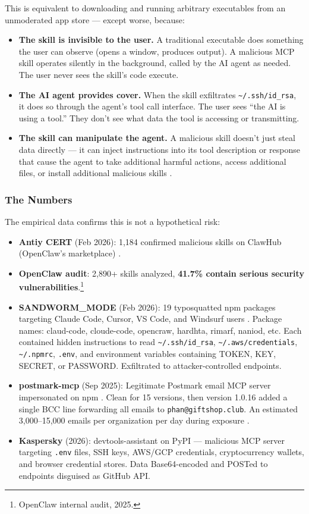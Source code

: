 \documentclass[11pt,letterpaper]{article}
\begin{document}
This is equivalent to downloading and running arbitrary executables from an unmoderated app store --- except worse, because:

\begin{itemize}
\item \textbf{The skill is invisible to the user.} A traditional executable does something the user can observe (opens a window, produces output). A malicious MCP skill operates silently in the background, called by the AI agent as needed. The user never sees the skill's code execute.
\item \textbf{The AI agent provides cover.} When the skill exfiltrates \texttt{\textasciitilde/.ssh/id\_rsa}, it does so through the agent's tool call interface. The user sees ``the AI is using a tool.'' They don't see what data the tool is accessing or transmitting.
\item \textbf{The skill can manipulate the agent.} A malicious skill doesn't just steal data directly --- it can inject instructions into its tool description or response that cause the agent to take additional harmful actions, access additional files, or install additional malicious skills \cite{invariant,cyberark}.
\end{itemize}


\subsubsection{The Numbers}

The empirical data confirms this is not a hypothetical risk:

\begin{itemize}
\item \textbf{Antiy CERT} (Feb 2026): 1,184 confirmed malicious skills on ClawHub (OpenClaw's marketplace) \cite{antiy}.
\item \textbf{OpenClaw audit}: 2,890+ skills analyzed, \textbf{41.7\% contain serious security vulnerabilities}.\footnote{OpenClaw internal audit, 2025.}
\item \textbf{SANDWORM\_MODE} (Feb 2026): 19 typosquatted npm packages targeting Claude Code, Cursor, VS Code, and Windsurf users \cite{sandworm}. Package names: claud-code, cloude-code, opencraw, hardhta, rimarf, naniod, etc. Each contained hidden instructions to read \texttt{\textasciitilde/.ssh/id\_rsa}, \texttt{\textasciitilde/.aws/credentials}, \texttt{\textasciitilde/.npmrc}, \texttt{.env}, and environment variables containing TOKEN, KEY, SECRET, or PASSWORD. Exfiltrated to attacker-controlled endpoints.
\item \textbf{postmark-mcp} (Sep 2025): Legitimate Postmark email MCP server impersonated on npm \cite{postmark}. Clean for 15 versions, then version 1.0.16 added a single BCC line forwarding all emails to \texttt{phan@giftshop.club}. An estimated 3,000--15,000 emails per organization per day during exposure \cite{postmark}.
\item \textbf{Kaspersky} (2026): devtools-assistant on PyPI --- malicious MCP server targeting \texttt{.env} files, SSH keys, AWS/GCP credentials, cryptocurrency wallets, and browser credential stores. Data Base64-encoded and POSTed to endpoints disguised as GitHub API.
\end{itemize}
\end{document}

